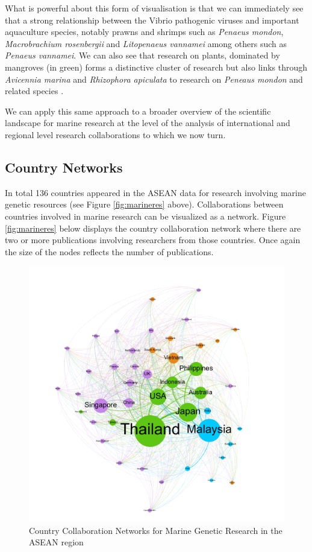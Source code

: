 \documentclass[]{book}
\theoremstyle{definition}
\theoremstyle{definition}
\theoremstyle{definition}
\theoremstyle{remark}
\begin{document}
What is powerful about this form of visualisation is that we can
immediately see that a strong relationship between the Vibrio pathogenic
viruses and important aquaculture species, notably prawns and shrimps
such as \emph{Penaeus mondon}, \emph{Macrobrachium rosenbergii} and
\emph{Litopenaeus vannamei} among others such as \emph{Penaeus
vannamei}. We can also see that research on plants, dominated by
mangroves (in green) forms a distinctive cluster of research but also
links through \emph{Avicennia marina} and \emph{Rhizophora apiculata} to
research on \emph{Peneaus mondon} and related species \citep{Hai_2005}.

We can apply this same approach to a broader overview of the scientific
landscape for marine research at the level of the analysis of
international and regional level research collaborations to which we now
turn.

\hypertarget{country-networks}{%
\subsection{Country Networks}\label{country-networks}}

In total 136 countries appeared in the ASEAN data for research involving
marine genetic resources (see Figure \ref{fig:marineres} above).
Collaborations between countries involved in marine research can be
visualized as a network. Figure \ref{fig:marineres} below displays the
country collaboration network where there are two or more publications
involving researchers from those countries. Once again the size of the
nodes reflects the number of publications.

\begin{figure}

{\centering \includegraphics[width=1\linewidth]{images/aseanmarinlit_country_network} 

}

\caption{Country Collaboration Networks for Marine Genetic Research in the ASEAN region}\label{fig:countrynetwork}
\end{figure}
\end{document}
